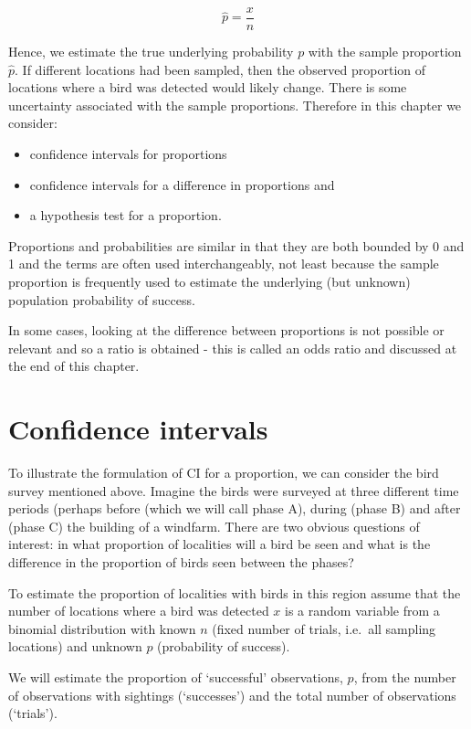 \documentclass[
  oneside]{krantz}
\providecommand{\tightlist}{%
  \setlength{\itemsep}{0pt}\setlength{\parskip}{0pt}}
\begin{document}
\[\hat p = \frac{x}{n}\]

Hence, we estimate the true underlying probability \(p\) with the sample proportion \(\hat p\). If different locations had been sampled, then the observed proportion of locations where a bird was detected would likely change. There is some uncertainty associated with the sample proportions. Therefore in this chapter we consider:

\begin{itemize}
\tightlist
\item
  confidence intervals for proportions
\item
  confidence intervals for a difference in proportions and
\item
  a hypothesis test for a proportion.
\end{itemize}

Proportions and probabilities are similar in that they are both bounded by 0 and 1 and the terms are often used interchangeably, not least because the sample proportion is frequently used to estimate the underlying (but unknown) population probability of success.

In some cases, looking at the difference between proportions is not possible or relevant and so a ratio is obtained - this is called an odds ratio and discussed at the end of this chapter.

\hypertarget{confidence-intervals}{%
\section{Confidence intervals}\label{confidence-intervals}}

To illustrate the formulation of CI for a proportion, we can consider the bird survey mentioned above. Imagine the birds were surveyed at three different time periods (perhaps before (which we will call phase A), during (phase B) and after (phase C) the building of a windfarm. There are two obvious questions of interest: in what proportion of localities will a bird be seen and what is the difference in the proportion of birds seen between the phases?

To estimate the proportion of localities with birds in this region assume that the number of locations where a bird was detected \(x\) is a random variable from a binomial distribution with known \(n\) (fixed number of trials, i.e.~all sampling locations) and unknown \(p\) (probability of success).

We will estimate the proportion of `successful' observations, \(p\), from the number of observations with sightings (`successes') and the total number of observations (`trials').
\end{document}
